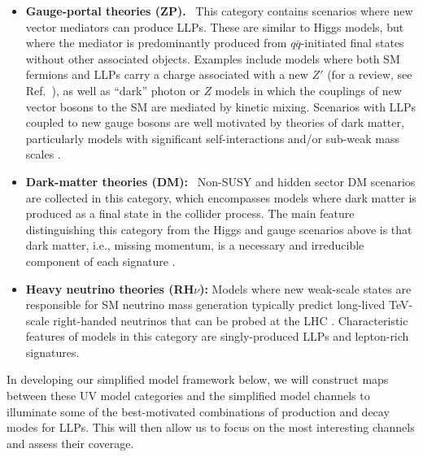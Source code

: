 \begin{itemize}
\item {\bf Gauge-portal theories (ZP).}~ This category contains scenarios where new vector mediators can produce LLPs. These are similar to Higgs models, but where the mediator is predominantly produced from $q\bar{q}$-initiated final states without other associated objects. Examples include models where both SM fermions and LLPs carry a charge associated with a new $Z'$ (for a review, see Ref.~\cite{Langacker:2008yv}), as well as ``dark'' photon or $Z$ models \cite{Holdom:1985ag} in which the couplings of new vector bosons to the SM are mediated by kinetic mixing. Scenarios with LLPs coupled to new gauge bosons are well motivated by theories of dark matter, particularly models with significant self-interactions \cite{Feng:2009hw,Buckley:2009in,Tulin:2012wi} and/or sub-weak mass scales \cite{Boehm:2003hm,Boehm:2003ha,Pospelov:2007mp,ArkaniHamed:2008qp,ArkaniHamed:2008qn}.

\item {\bf Dark-matter theories (DM):}~ Non-SUSY and hidden sector DM scenarios are collected in this category, which encompasses models where dark matter is produced as a final state in the collider process. The main feature distinguishing this category from the Higgs and gauge scenarios above is that dark matter, i.e., missing momentum, is a necessary and irreducible component of each signature  \cite{Strassler:2006im,Strassler:2006ri,Baumgart:2009tn,Falkowski:2010cm,Bai:2011jg,Primulando:2015lfa,Bai:2015nfa,Izaguirre:2015zva,Khoze:2017ixx,Buchmueller:2017uqu}.

\item {\bf Heavy neutrino theories (RH$\nu$):}  Models where  new weak-scale states are responsible for SM neutrino mass generation \cite{Minkowski:1977sc,Yanagida:1979as,Mohapatra:1979ia,Mohapatra:1986bd} typically predict long-lived TeV-scale right-handed neutrinos that can be probed at the LHC \cite{Basso:2008iv,Perez:2009mu}.  Characteristic features of models in this category are singly-produced LLPs and lepton-rich signatures.

\end{itemize}

%
In developing our simplified model framework below, we will construct maps between these UV model categories and the simplified model channels to illuminate some of the best-motivated combinations of production and decay modes for LLPs. This will then allow us to focus on the most interesting channels and assess their coverage.


